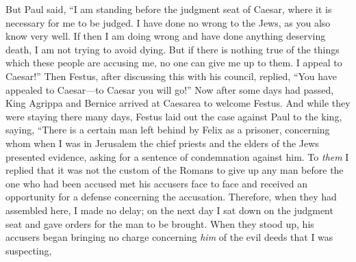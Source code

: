 \begin{biblechapter}
\verse But Paul said, “I am standing before the judgment seat of Caesar, where it is necessary for me to be judged. I have done no wrong to the Jews, as you also know very well.
\verse If then I am doing wrong and have done anything deserving death, I am not trying to avoid dying. But if there is nothing true of the things which these people are accusing me, no one can give me up to them. I appeal to Caesar!”
\verse Then Festus, after discussing this with his council, replied, “You have appealed to Caesar—to Caesar you will go!”
 Now after some days had passed, King Agrippa and Bernice arrived at Caesarea to welcome Festus.
\verse And while they were staying there many days, Festus laid out the case against Paul to the king, saying, “There is a certain man left behind by Felix as a prisoner,
\verse concerning whom when I was in Jerusalem the chief priests and the elders of the Jews presented evidence, asking for a sentence of condemnation against him.
\verse To \textit{them} I replied that it was not the custom of the Romans to give up any man before the one who had been accused met his accusers face to face and received an opportunity for a defense concerning the accusation.
\verse Therefore, when they had assembled here, I made no delay; on the next day I sat down on the judgment seat and gave orders for the man to be brought.
\verse When they stood up, his accusers began bringing no charge concerning \textit{him} of the evil deeds that I was suspecting,

\end{biblechapter}
